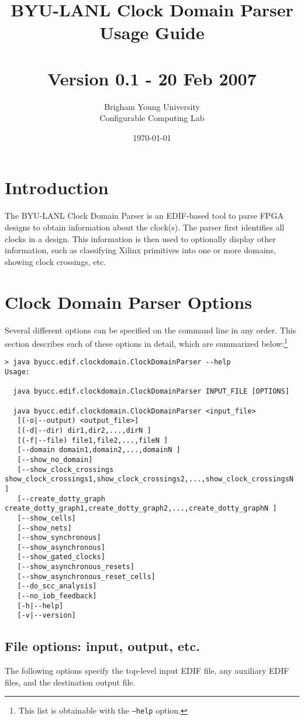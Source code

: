 \documentclass[english]{article}
\title{BYU-LANL Clock Domain Parser \\ Usage Guide \\ ~ \\
  Version 0.1 - 20 Feb 2007}
\author{Brigham Young University \\ Configurable Computing Lab}
\date{\today}
\begin{document}
\maketitle

\newpage
\tableofcontents
\newpage

\section{Introduction}
The BYU-LANL Clock Domain Parser is an EDIF-based tool to parse FPGA designs to
obtain information about the clock(s). The parser first identifies all clocks
in a design. This information is then used to optionally display other
information, such as classifying Xilinx primitives into one or more domains,
showing clock crossings, etc.

\section{Clock Domain Parser Options}
Several different options can be specified on the command line in any order.
This section describes each of these options in detail, which are 
summarized below:\footnote{This list is obtainable with the \texttt{--help} 
option.}

\begin{verbatim}
> java byucc.edif.clockdomain.ClockDomainParser --help
Usage:

  java byucc.edif.clockdomain.ClockDomainParser INPUT_FILE [OPTIONS]

  java byucc.edif.clockdomain.ClockDomainParser <input_file>
   [(-o|--output) <output_file>]
   [(-d|--dir) dir1,dir2,...,dirN ]
   [(-f|--file) file1,file2,...,fileN ]
   [--domain domain1,domain2,...,domainN ]
   [--show_no_domain]
   [--show_clock_crossings show_clock_crossings1,show_clock_crossings2,...,show_clock_crossingsN ]
   [--create_dotty_graph create_dotty_graph1,create_dotty_graph2,...,create_dotty_graphN ]
   [--show_cells]
   [--show_nets]
   [--show_synchronous]
   [--show_asynchronous]
   [--show_gated_clocks]
   [--show_asynchronous_resets]
   [--show_asynchronous_reset_cells]
   [--do_scc_analysis]
   [--no_iob_feedback]
   [-h|--help]
   [-v|--version]
\end{verbatim}

\subsection{File options: input, output, etc.}
The following options specify the top-level input EDIF file, any auxiliary EDIF
files, and the destination output file.
\end{document}
